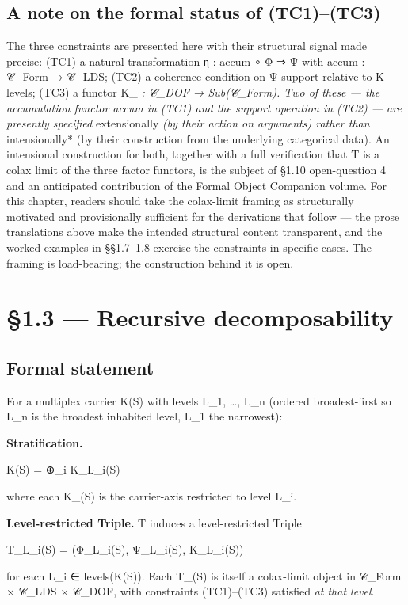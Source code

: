\documentclass[11pt, openany]{book}
\newcommand{\sectionbreak}{\clearpage}
\begin{document}
\subsection{A note on the formal status of (TC1)–(TC3)}

The three constraints are presented here with their structural signal made precise: (TC1) a natural transformation η : accum ∘ Φ ⇒ Ψ with accum : 𝒞\_\allowbreak{}Form → 𝒞\_\allowbreak{}LDS; (TC2) a coherence condition on Ψ-support relative to Κ-levels; (TC3) a functor Κ\_\allowbreak{}\textit{ : 𝒞\_\allowbreak{}DOF → Sub(𝒞\_\allowbreak{}Form). Two of these --- the accumulation functor accum in (TC1) and the support operation in (TC2) --- are presently specified }extensionally\textit{ (by their action on arguments) rather than }intensionally* (by their construction from the underlying categorical data). An intensional construction for both, together with a full verification that T is a colax limit of the three factor functors, is the subject of §1.10 open-question 4 and an anticipated contribution of the Formal Object Companion volume. For this chapter, readers should take the colax-limit framing as structurally motivated and provisionally sufficient for the derivations that follow --- the prose translations above make the intended structural content transparent, and the worked examples in §§1.7–1.8 exercise the constraints in specific cases. The framing is load-bearing; the construction behind it is open.

\sectionbreak

\section{§1.3 --- Recursive decomposability}

\subsection{Formal statement}

For a multiplex carrier Κ(S) with levels {L\_\allowbreak{}1, …, L\_\allowbreak{}n} (ordered broadest-first so L\_\allowbreak{}n is the broadest inhabited level, L\_\allowbreak{}1 the narrowest):

\textbf{Stratification.}
\begin{Code}
Κ(S) = ⊕_i Κ_{L_i}(S)
\end{Code}
where each Κ\_(S) is the carrier-axis restricted to level L\_\allowbreak{}i.

\textbf{Level-restricted Triple.} T induces a level-restricted Triple
\begin{Code}
T_{L_i}(S) = (Φ_{L_i}(S), Ψ_{L_i}(S), Κ_{L_i}(S))
\end{Code}
for each L\_\allowbreak{}i ∈ levels(Κ(S)). Each T\_(S) is itself a colax-limit object in 𝒞\_\allowbreak{}Form × 𝒞\_\allowbreak{}LDS × 𝒞\_\allowbreak{}DOF, with constraints (TC1)–(TC3) satisfied \textit{at that level}.
\end{document}
